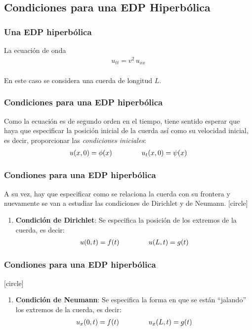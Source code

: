 \documentclass[12pt]{beamer}
\begin{document}
\subsection{Condiciones para una EDP Hiperbólica}

\begin{frame}
\frametitle{Una EDP hiperbólica}
La ecuación de onda
\begin{align*}
u_{tt} = v^{2} \, u_{xx}
\end{align*}
\\
\bigskip
\pause
En este caso se considera una cuerda de longitud $L$.
\end{frame}
\begin{frame}
\frametitle{Condiciones para una EDP hiperbólica}
Como la ecuación es de segundo orden en el tiempo, tiene sentido esperar que haya que especificar la posición inicial de la cuerda así como su velocidad inicial, es decir, proporcionar las \emph{condiciones iniciales}:
\begin{align}
u(x, 0) = \phi (x) \hspace{1.5cm} u_{t}(x, 0) = \psi (x)
\label{eq:ecuacion_06_02_07}
\end{align}
\end{frame}
\begin{frame}
\frametitle{Condiones para una EDP hiperbólica}
A su vez, hay que especificar como se relaciona la cuerda con su frontera y nuevamente se van a estudiar las condiciones de Dirichlet y de Neumann.
\pause
{}
[circle]
\begin{enumerate}[<+->]
\item \textbf{Condición de Dirichlet}: Se especifica la posición de los extremos de la cuerda, es decir:
\begin{align}
u(0, t) = f (t) \hspace{1.5cm} u(L, t) = g(t)
\label{eq:ecuacion_06_02_08}   
\end{align}
\seti
\end{enumerate}
\end{frame}
\begin{frame}
\frametitle{Condiones para una EDP hiperbólica}
[circle]
\begin{enumerate}[<+->]
\conti    
\item \textbf{Condición de Neumann}: Se especifica la forma en que se están \enquote{jalando} los extremos de la cuerda, es decir:
\begin{align}
u_{x}(0, t) = f(t) \hspace{1.5cm} u_{x}(L,t) = g(t)
\label{eq:ecuacion_06_02_09}    
\end{align}
\end{enumerate}
\end{frame}
\end{document}
